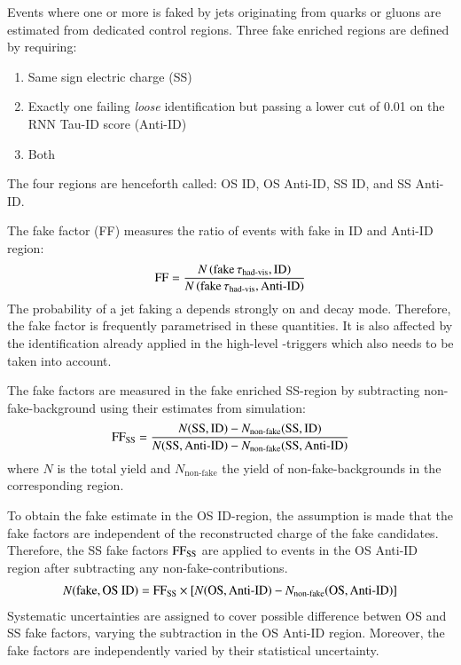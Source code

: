 Events where one or more \tauhadvis is faked by jets originating from quarks or
gluons are estimated from dedicated control regions. Three fake enriched regions
are defined by requiring:
\begin{enumerate}
\item Same sign electric charge \tauhadvis (SS)
\item Exactly one \tauhadvis failing \textit{loose} identification but passing a
  lower cut of 0.01 on the RNN Tau-ID score (Anti-ID)
\item Both
\end{enumerate}
The four regions are henceforth called: OS ID, OS Anti-ID, SS ID, and SS
Anti-ID.

The fake factor (FF) measures the ratio of events with fake \tauhadvis in ID and
Anti-ID region:
\begin{align*}
  \text{FF} = \frac{N\left( \text{fake} \, \tau_{\text{had-vis}}, \text{ID} \right)}{N\left( \text{fake} \, \tau_{\text{had-vis}}, \text{Anti-ID} \right)}
\end{align*}
The probability of a jet faking a \tauhadvis depends strongly on \tauhadvis \pT
and decay mode. Therefore, the fake factor is frequently parametrised in these
quantities. It is also affected by the \tauhadvis identification already applied
in the high-level \tauhadvis-triggers which also needs to be taken into account.

The fake factors are measured in the fake enriched SS-region by subtracting
non-fake-\tauhadvis background using their estimates from simulation:
\begin{align*}
  \text{FF}_\text{SS} = \frac{N(\text{SS}, \text{ID}) - N_\text{non-fake}(\text{SS}, \text{ID})}{N(\text{SS}, \text{Anti-ID}) - N_\text{non-fake}(\text{SS}, \text{Anti-ID})}
\end{align*}
where $N$ is the total yield and $N_\text{non-fake}$ the yield of
non-fake-\tauhadvis backgrounds in the corresponding region.

To obtain the fake \tauhadvis estimate in the OS ID-region, the assumption is
made that the fake factors are independent of the reconstructed charge of the
fake \tauhadvis candidates. Therefore, the SS fake factors $\text{FF}_\text{SS}$ are
applied to events in the OS Anti-ID region after subtracting any
non-fake-\tauhadvis contributions.
\begin{align*}
  N(\text{fake}, \text{OS ID}) = \text{FF}_\text{SS} \times \left[ N(\text{OS}, \text{Anti-ID}) - N_\text{non-fake}(\text{OS}, \text{Anti-ID}) \right]
\end{align*}
Systematic uncertainties are assigned to
cover possible difference betwen OS and SS fake factors, varying the
subtraction in the OS Anti-ID region. Moreover, the fake factors are
independently varied by their statistical uncertainty.

